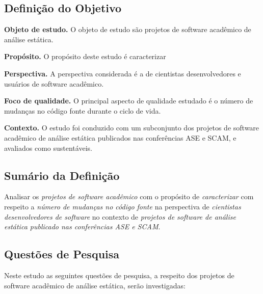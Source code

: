 \subsection{Definição do Objetivo}

\begin{description}
\item{\bf Objeto de estudo.}
O objeto de estudo são projetos de software acadêmico de análise estática.

\item{\bf Propósito.}
O propósito deste estudo é caracterizar 

\item{\bf Perspectiva.}
A perspectiva considerada é a de cientistas desenvolvedores e usuários de software acadêmico.

\item{\bf Foco de qualidade.}
O principal aspecto de qualidade estudado é o número de mudanças no código fonte durante o ciclo de vida.

\item{\bf Contexto.}
O estudo foi conduzido com um subconjunto dos projetos de software acadêmico de análise estática
publicados nas conferências ASE e SCAM, e avaliados como sustentáveis.
\end{description}


\subsection{Sumário da Definição}

Analisar os \textit{projetos de software acadêmico}
com o propósito de \textit{caracterizar}  %
com respeito a \textit{número de mudanças no código fonte}  %
na perspectiva de \textit{cientistas desenvolvedores de software}%
no contexto de \textit{projetos de software de análise estática publicado nas conferências ASE e SCAM}.

\subsection{Questões de Pesquisa}

Neste estudo as seguintes questões de pesquisa, a respeito dos projetos de
software acadêmico de análise estática, serão investigadas:

\newcommand{\EstudoTresQuestaoUm}{
  Em qual estágio de evolução estão os projetos de software acadêmico de análise
  estática dentro do seu ciclo de vida?
}

